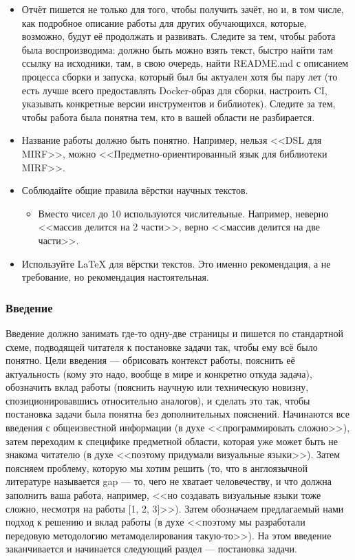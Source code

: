 \documentclass{article}
\begin{document}
\begin{itemize}
    \item Отчёт пишется не только для того, чтобы получить зачёт, но и, в том числе, как подробное описание работы для других обучающихся, которые, возможно, будут её продолжать и развивать. Следите за тем, чтобы работа была воспроизводима: должно быть можно взять текст, быстро найти там ссылку на исходники, там, в свою очередь, найти README.md с описанием процесса сборки и запуска, который был бы актуален хотя бы пару лет (то есть лучше всего предоставлять Docker-образ для сборки, настроить CI, указывать конкретные версии инструментов и библиотек). Следите за тем, чтобы работа была понятна тем, кто в вашей области не разбирается.
    \item Название работы должно быть понятно. Например, нельзя <<DSL для MIRF>>, можно <<Предметно-ориентированный язык для библиотеки MIRF>>.
    \item Соблюдайте общие правила вёрстки научных текстов.
    \begin{itemize}
        \item Вместо чисел до 10 используются числительные. Например, неверно <<массив делится на 2 части>>, верно <<массив делится на две части>>.
    \end{itemize}
    \item Используйте LaTeX для вёрстки текстов. Это именно рекомендация, а не требование, но рекомендация настоятельная.
\end{itemize}

\subsubsection{Введение}

Введение должно занимать где-то одну-две страницы и пишется по стандартной схеме, подводящей читателя к постановке задачи так, чтобы ему всё было понятно. Цели введения --- обрисовать контекст работы, пояснить её актуальность (кому это надо, вообще в мире и конкретно откуда задача), обозначить вклад работы (пояснить научную или техническую новизну, спозиционировавшись относительно аналогов), и сделать это так, чтобы постановка задачи была понятна без дополнительных пояснений. Начинаются все введения с общеизвестной информации (в духе <<программировать сложно>>), затем переходим к специфике предметной области, которая уже может быть не знакома читателю (в духе <<поэтому придумали визуальные языки>>). Затем поясняем проблему, которую мы хотим решить (то, что в англоязычной литературе называется gap --- то, чего не хватает человечеству, и что должна заполнить ваша работа, например, <<но создавать визуальные языки тоже сложно, несмотря на работы [1, 2, 3]>>). Затем обозначаем предлагаемый нами подход к решению и вклад работы (в духе <<поэтому мы разработали передовую методологию метамоделирования такую-то>>). На этом введение заканчивается и начинается следующий раздел --- постановка задачи.
\end{document}
